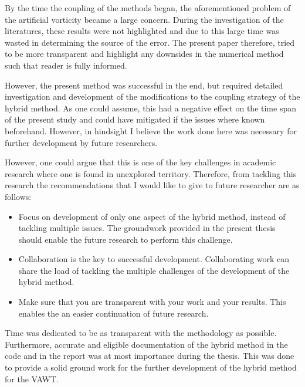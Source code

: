 By the time the coupling of the methods began, the aforementioned problem of the artificial vorticity became a large concern. During the investigation of the literatures, these results were not highlighted and due to this large time was wasted in determining the source of the error. The present paper therefore, tried to be more transparent and highlight any downsides in the numerical method such that reader is fully informed.

However, the present method was successful in the end, but required detailed investigation and development of the modifications to the coupling strategy of the hybrid method. As one could assume, this had a negative effect on the time span of the present study and could have mitigated if the issues where known beforehand. However, in hindsight I believe the work done here was necessary for further development by future researchers.

However, one could argue that this is one of the key challenges in academic research where one is found in unexplored territory. Therefore, from tackling this research the recommendations that I would like to give to future researcher are as follows:
\begin{itemize}
\item Focus on development of only one aspect of the hybrid method, instead of tackling multiple issues. The groundwork provided in the present thesis should enable the future research to perform this challenge.
\item Collaboration is the key to successful development. Collaborating work can share the load of tackling the multiple challenges of the development of the hybrid method. %
\item Make sure that you are transparent with your work and your results. This enables the an easier continuation of future research.
\end{itemize}

Time was dedicated to be as transparent with the methodology as possible. Furthermore, accurate and eligible documentation of the hybrid method in the code and in the report was at most importance during the thesis. This was done to provide a solid ground work for the further development of the hybrid method for the VAWT.



